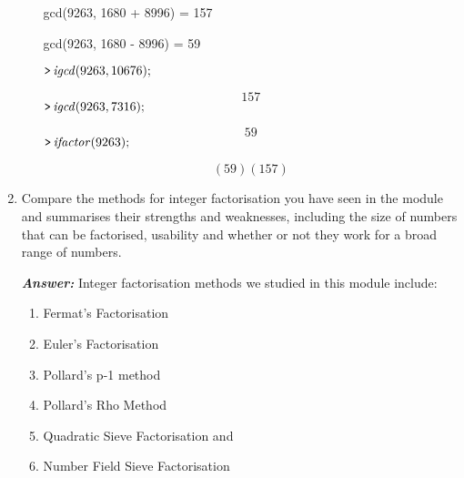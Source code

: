 \documentclass[11pt,a4paper,fleqn]{article}
\begin{document}
\begin{enumerate}[1.]
\begin{enumerate}[a.]
\begin{flushleft}
\begin{mdframed}
                \begin{Maple Normal}
                    gcd(9263, 1680 + 8996) =  157

                    gcd(9263, 1680 - 8996) =  59
                \end{Maple Normal}
                \mapleinput
                {$ \displaystyle \texttt{>\,} \mathit{igcd} (9263,10676); $}

                \begin{dmath}\label{(30)}
                    157
                \end{dmath}
                \mapleinput
                {$ \displaystyle \texttt{>\,} \mathit{igcd} (9263,7316); $}

                \begin{dmath}\label{(31)}
                    59
                \end{dmath}
                \mapleinput
                {$ \displaystyle \texttt{>\,} \mathit{ifactor} (9263); $}

                \begin{dmath}\label{(32)}
                    \left(59\right) \left(157\right)
                \end{dmath}
            \end{mdframed}
            \end{flushleft}
        \end{enumerate}

		\item Compare the methods for integer factorisation you have seen in the module and summarises their strengths and weaknesses, including the size of numbers that can be factorised, usability and whether or not they work for a broad range of numbers.
        \begin{flushleft}
            \textbf{\textit{Answer:}} Integer factorisation methods we studied in this module include:
            \begin{enumerate}
                \item Fermat's Factorisation
                \item Euler's Factorisation
                \item Pollard's p-1 method
                \item Pollard's Rho Method
                \item Quadratic Sieve Factorisation and
                \item Number Field Sieve Factorisation
            \end{enumerate}


\end{flushleft}
\end{enumerate}
\end{document}
